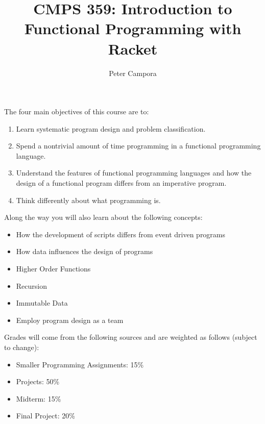 \documentclass{article}
\begin{document}
\title{CMPS 359: Introduction to Functional Programming with Racket}
\author{Peter Campora}
%
\maketitle 
\noindent The four main objectives of this course are to:
%
\begin{enumerate}
\item Learn systematic program design and problem classification.
\item Spend a nontrivial amount of time programming in a functional programming language.
\item Understand the features of functional programming languages and how the design of a functional
  program differs from an imperative program.
\item Think differently about what programming is.
\end{enumerate}

\noindent Along the way you will also learn about the following concepts:
\begin{itemize}
\item How the development of scripts differs from event driven programs
\item How data influences the design of programs
\item Higher Order Functions
\item Recursion
\item Immutable Data
\item Employ program design as a team
\end{itemize}

\noindent Grades will come from the following sources and are weighted as follows (subject to change):
\begin{itemize}
\item Smaller Programming Assignments: 15\%
\item Projects: 50\%
\item Midterm: 15\%
\item Final Project: 20\%
\end{itemize}

\end{document}
